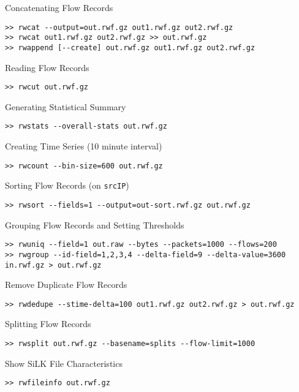 Concatenating Flow Records

\begin{lstlisting}
>> rwcat --output=out.rwf.gz out1.rwf.gz out2.rwf.gz
>> rwcat out1.rwf.gz out2.rwf.gz >> out.rwf.gz
>> rwappend [--create] out.rwf.gz out1.rwf.gz out2.rwf.gz
\end{lstlisting}

Reading Flow Records

\begin{lstlisting}
>> rwcut out.rwf.gz
\end{lstlisting}

Generating Statistical Summary

\begin{lstlisting}
>> rwstats --overall-stats out.rwf.gz
\end{lstlisting}

Creating Time Series (10 minute interval)

\begin{lstlisting}
>> rwcount --bin-size=600 out.rwf.gz
\end{lstlisting}

Sorting Flow Records (on \lstinline!srcIP!)

\begin{lstlisting}
>> rwsort --fields=1 --output=out-sort.rwf.gz out.rwf.gz
\end{lstlisting}

Grouping Flow Records and Setting Thresholds

\begin{lstlisting}
>> rwuniq --field=1 out.raw --bytes --packets=1000 --flows=200
>> rwgroup --id-field=1,2,3,4 --delta-field=9 --delta-value=3600 in.rwf.gz > out.rwf.gz
\end{lstlisting}

Remove Duplicate Flow Records

\begin{lstlisting}
>> rwdedupe --stime-delta=100 out1.rwf.gz out2.rwf.gz > out.rwf.gz
\end{lstlisting}

Splitting Flow Records

\begin{lstlisting}
>> rwsplit out.rwf.gz --basename=splits --flow-limit=1000
\end{lstlisting}

Show SiLK File Characteristics

\begin{lstlisting}
>> rwfileinfo out.rwf.gz
\end{lstlisting}

